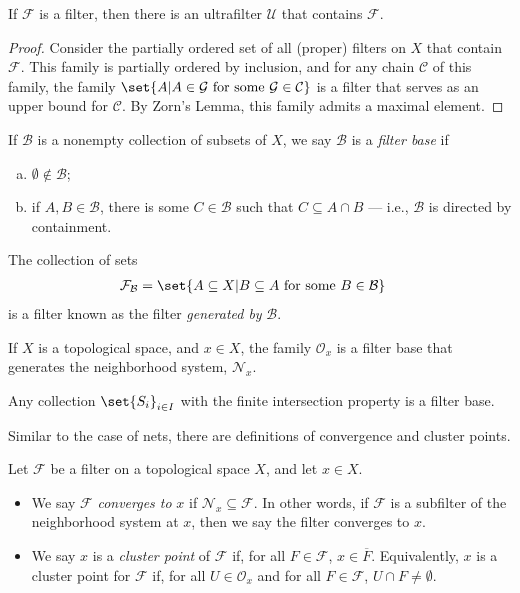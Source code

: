 \documentclass[11pt]{mypackage}
\begin{document}
\begin{theorem}
  If $\mathcal{F}$ is a filter, then there is an ultrafilter $\mathcal{U}$ that contains $\mathcal{F}$.
\end{theorem}
\begin{proof}
  Consider the partially ordered set of all (proper) filters on $X$ that contain $\mathcal{F}$. This family is partially ordered by inclusion, and for any chain $\mathcal{C}$ of this family, the family $\set{A | A\in \mathcal{G}\text{ for some }\mathcal{G}\in \mathcal{C}}$ is a filter that serves as an upper bound for $\mathcal{C}$. By Zorn's Lemma, this family admits a maximal element.
\end{proof}
\begin{definition}
  If $\mathcal{B}$ is a nonempty collection of subsets of $X$, we say $\mathcal{B}$ is a \textit{filter base} if
  \begin{enumerate}[(a)]
    \item $\emptyset\notin \mathcal{B}$;
    \item if $A,B\in \mathcal{B}$, there is some $C\in \mathcal{B}$ such that $C\subseteq A\cap B$ --- i.e., $\mathcal{B}$ is directed by containment.
  \end{enumerate}
  The collection of sets
  \begin{align*}
    \mathcal{F}_{\mathcal{B}} &= \set{A\subseteq X | B\subseteq A\text{ for some }B\in \mathcal{B}}
  \end{align*}
  is a filter known as the filter \textit{generated by} $\mathcal{B}$.
\end{definition}
\begin{example}
  If $X$ is a topological space, and $x\in X$, the family $\mathcal{O}_{x}$ is a filter base that generates the neighborhood system, $\mathcal{N}_{x}$.
\end{example}
\begin{proposition}
  Any collection $\set{S_i}_{i\in I}$ with the finite intersection property is a filter base.
\end{proposition}
Similar to the case of nets, there are definitions of convergence and cluster points.
\begin{definition}
  Let $\mathcal{F}$ be a filter on a topological space $X$, and let $x\in X$.
  \begin{itemize}
    \item We say $\mathcal{F}$ \textit{converges to} $x$ if $\mathcal{N}_{x}\subseteq \mathcal{F}$. In other words, if $\mathcal{F}$ is a subfilter of the neighborhood system at $x$, then we say the filter converges to $x$.
    \item We say $x$ is a \textit{cluster point} of $\mathcal{F}$ if, for all $F\in \mathcal{F}$, $x\in \overline{F}$. Equivalently, $x$ is a cluster point for $\mathcal{F}$ if, for all $U\in \mathcal{O}_{x}$ and for all $F\in \mathcal{F}$, $U\cap F \neq \emptyset$.
  \end{itemize}
\end{definition}
\end{document}
